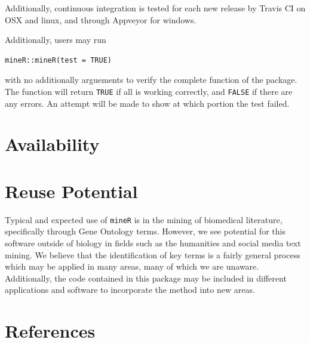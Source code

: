 \documentclass[twoside]{article}
\begin{document}
Additionally, continuous integration is tested for each new release by Travis CI on OSX and linux, and through Appveyor for windows. 

Additionally, users may run 

\begin{verbatim}
mineR::mineR(test = TRUE)
\end{verbatim}

with no additionally arguements to verify the complete function of the package. The function will return \texttt{TRUE} if all is working correctly, and \texttt{FALSE} if there are any errors. An attempt will be made to show at which portion the test failed.

\section{Availability}

\section{Reuse Potential}

Typical and expected use of \texttt{mineR} is in the mining of biomedical literature, specifically through Gene Ontology terms. However, we see potential for this software outside of biology in fields such as the humanities and social media text mining. We believe that the identification of key terms is a fairly general process which may be applied in many areas, many of which we are unaware. Additionally, the code contained in this package may be included in different applications and software to incorporate the method into new areas. 

\section{References}



\newpage
\listoftodos[Notes]
\end{document}
